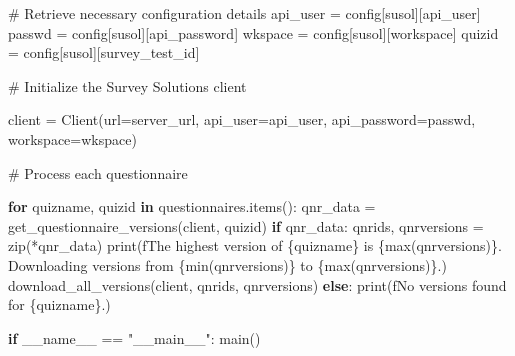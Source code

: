 \documentclass[
  letterpaper,
  DIV=11,
  numbers=noendperiod]{scrreprt}
\newenvironment{Shaded}{\begin{snugshade}}{\end{snugshade}}
\newcommand{\BuiltInTok}[1]{\textcolor[rgb]{0.00,0.23,0.31}{#1}}
\newcommand{\CommentTok}[1]{\textcolor[rgb]{0.37,0.37,0.37}{#1}}
\newcommand{\ControlFlowTok}[1]{\textcolor[rgb]{0.00,0.23,0.31}{\textbf{#1}}}
\newcommand{\KeywordTok}[1]{\textcolor[rgb]{0.00,0.23,0.31}{\textbf{#1}}}
\newcommand{\NormalTok}[1]{\textcolor[rgb]{0.00,0.23,0.31}{#1}}
\newcommand{\OperatorTok}[1]{\textcolor[rgb]{0.37,0.37,0.37}{#1}}
\newcommand{\SpecialCharTok}[1]{\textcolor[rgb]{0.37,0.37,0.37}{#1}}
\newcommand{\SpecialStringTok}[1]{\textcolor[rgb]{0.13,0.47,0.30}{#1}}
\newcommand{\StringTok}[1]{\textcolor[rgb]{0.13,0.47,0.30}{#1}}
\newcommand{\VariableTok}[1]{\textcolor[rgb]{0.07,0.07,0.07}{#1}}
\begin{document}
\begin{Shaded}
\begin{Highlighting}[]
    

    \CommentTok{\# Retrieve necessary configuration details}
\NormalTok{    api\_user }\OperatorTok{=}\NormalTok{ config[}\StringTok{\textquotesingle{}susol\textquotesingle{}}\NormalTok{][}\StringTok{\textquotesingle{}api\_user\textquotesingle{}}\NormalTok{]}
\NormalTok{    passwd }\OperatorTok{=}\NormalTok{ config[}\StringTok{\textquotesingle{}susol\textquotesingle{}}\NormalTok{][}\StringTok{\textquotesingle{}api\_password\textquotesingle{}}\NormalTok{]}
\NormalTok{    wkspace }\OperatorTok{=}\NormalTok{ config[}\StringTok{\textquotesingle{}susol\textquotesingle{}}\NormalTok{][}\StringTok{\textquotesingle{}workspace\textquotesingle{}}\NormalTok{]}
\NormalTok{    quizid }\OperatorTok{=}\NormalTok{ config[}\StringTok{\textquotesingle{}susol\textquotesingle{}}\NormalTok{][}\StringTok{\textquotesingle{}survey\_test\_id\textquotesingle{}}\NormalTok{]}

   \CommentTok{\# Initialize the Survey Solutions client}
   
\NormalTok{    client }\OperatorTok{=}\NormalTok{ Client(url}\OperatorTok{=}\NormalTok{server\_url, api\_user}\OperatorTok{=}\NormalTok{api\_user, api\_password}\OperatorTok{=}\NormalTok{passwd, workspace}\OperatorTok{=}\NormalTok{wkspace)}

    \CommentTok{\# Process each questionnaire}
    
    \ControlFlowTok{for}\NormalTok{ quizname, quizid }\KeywordTok{in}\NormalTok{ questionnaires.items():}
\NormalTok{        qnr\_data }\OperatorTok{=}\NormalTok{ get\_questionnaire\_versions(client, quizid)}
        \ControlFlowTok{if}\NormalTok{ qnr\_data:}
\NormalTok{            qnrids, qnrversions }\OperatorTok{=} \BuiltInTok{zip}\NormalTok{(}\OperatorTok{*}\NormalTok{qnr\_data)}
            \BuiltInTok{print}\NormalTok{(}\SpecialStringTok{f\textquotesingle{}The highest version of }\SpecialCharTok{\{}\NormalTok{quizname}\SpecialCharTok{\}}\SpecialStringTok{ is }\SpecialCharTok{\{}\BuiltInTok{max}\NormalTok{(qnrversions)}\SpecialCharTok{\}}\SpecialStringTok{. Downloading versions from }\SpecialCharTok{\{}\BuiltInTok{min}\NormalTok{(qnrversions)}\SpecialCharTok{\}}\SpecialStringTok{ to }\SpecialCharTok{\{}\BuiltInTok{max}\NormalTok{(qnrversions)}\SpecialCharTok{\}}\SpecialStringTok{.\textquotesingle{}}\NormalTok{)}
\NormalTok{            download\_all\_versions(client, qnrids, qnrversions)}
        \ControlFlowTok{else}\NormalTok{:}
            \BuiltInTok{print}\NormalTok{(}\SpecialStringTok{f\textquotesingle{}No versions found for }\SpecialCharTok{\{}\NormalTok{quizname}\SpecialCharTok{\}}\SpecialStringTok{.\textquotesingle{}}\NormalTok{)}

\ControlFlowTok{if} \VariableTok{\_\_name\_\_} \OperatorTok{==} \StringTok{"\_\_main\_\_"}\NormalTok{:}
\NormalTok{    main()}
\end{Highlighting}
\end{Shaded}
\end{document}
